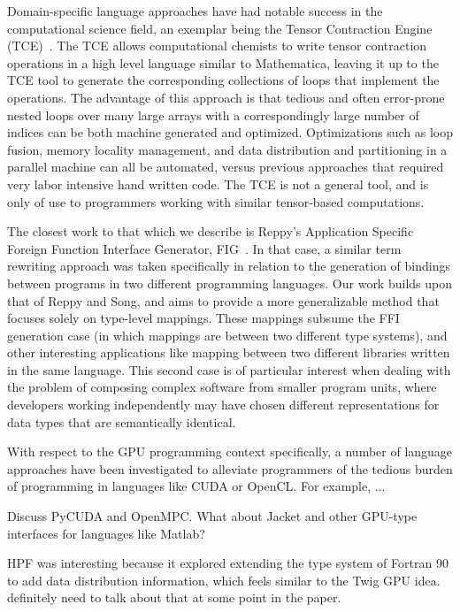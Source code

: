 \documentclass{acm_proc_article-sp}
\begin{document}
Domain-specific language approaches have had notable success in the computational
science field, an exemplar being the Tensor Contraction Engine (TCE)~\cite{baumgartner05synthesis}.  The TCE allows computational chemists to write tensor contraction operations in
a high level language similar to Mathematica, leaving it up to the TCE
tool to generate the corresponding collections of loops that implement the
operations.  The advantage of this approach is that tedious and often error-prone
nested loops over many large arrays with a correspondingly large number of indices can be both machine generated and optimized.  Optimizations such as loop fusion,
memory locality management, and data distribution and partitioning in a parallel
machine can all be automated, versus previous approaches that required very labor
intensive hand written code.  The TCE is not a general tool, and is only of use to
programmers working with similar tensor-based computations.

The closest work to that which we describe is Reppy's Application Specific Foreign Function Interface Generator, FIG~\cite{reppy06fig}.  In that case, a similar
term rewriting approach was taken specifically in relation to the generation of
bindings between programs in two different programming languages.  Our work builds
upon that of Reppy and Song, and aims to provide a more generalizable method 
that focuses solely on type-level mappings.  These mappings subsume the FFI generation case (in which mappings are between two different type systems), and other interesting applications like mapping between two different libraries written in the same language.  This second case is of particular interest when dealing with the
problem of composing complex software from smaller program units, where developers working independently may have chosen different representations for data types that are semantically identical.

With respect to the GPU programming context specifically, a number of language
approaches have been investigated to alleviate programmers of the tedious burden
of programming in languages like CUDA or OpenCL.  For example, ...


Discuss PyCUDA and OpenMPC. What about Jacket and other GPU-type interfaces
for languages like Matlab?

HPF was interesting because it explored extending the type system of Fortran
90 to add data distribution information, which feels similar to the Twig GPU
idea. definitely need to talk about that at some point in the paper.
\end{document}

